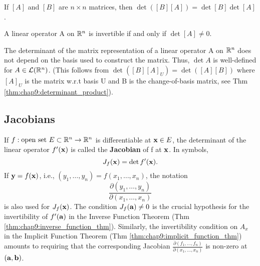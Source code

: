\begin{theorem}
  \label{thm:chap9:determinant_product}
  If $[A]$ and $[B]$ are $n \times n$ matrices, then $\det([B][A]) =
  \det[B] \det[A]$.
\end{theorem}

\begin{theorem}
  \label{thm:chap9:invertibility_iff_det_nonzero}
  A linear operator A on $\mathbb{R}^n$ is invertible if and only if $\det[A] \ne 0$.
\end{theorem}

\begin{remark}
  \label{rem:chap9:det_independent_of_basis}
  The determinant of the matrix representation of a linear operator A
  on $\mathbb{R}^n$ does not depend on the basis used to construct the
  matrix. Thus, $\det A$ is well-defined for $A \in
  \mathcal{L}(\mathbb{R}^n)$. (This follows from $\det([B][A]_U) =
    \det([A][B])$ where $[A]_U$ is the matrix w.r.t basis U and B is
  the change-of-basis matrix, see Thm \ref{thm:chap9:determinant_product}).
\end{remark}

\subsection*{Jacobians}
\label{sec:chap9:jacobians}

If $f: \text{open set } E \subset \mathbb{R}^n \to \mathbb{R}^n$ is differentiable
at $\mathbf{x} \in E$, the determinant of the linear operator
$f'(\mathbf{x})$ is called the \textbf{Jacobian} of f at $\mathbf{x}$. In symbols,
\[
  J_f(\mathbf{x}) = \det f'(\mathbf{x}).
\]
If $\mathbf{y} = f(\mathbf{x})$, i.e., $(y_1, \dots, y_n) = f(x_1, \dots,
x_n)$, the notation
\[
  \frac{\partial(y_1, \dots, y_n)}{\partial(x_1, \dots, x_n)}
\]
is also used for $J_f(\mathbf{x})$.
The condition $J_f(\mathbf{a}) \ne 0$ is the crucial hypothesis for the
invertibility of $f'(\mathbf{a})$ in the Inverse Function Theorem (Thm
\ref{thm:chap9:inverse_function_thm}). Similarly, the invertibility
condition on $A_x$ in the Implicit Function Theorem (Thm
\ref{thm:chap9:implicit_function_thm}) amounts to requiring that the
corresponding Jacobian $\frac{\partial(f_1, \dots,
f_n)}{\partial(x_1, \dots, x_n)}$ is non-zero at $(\mathbf{a}, \mathbf{b})$.



